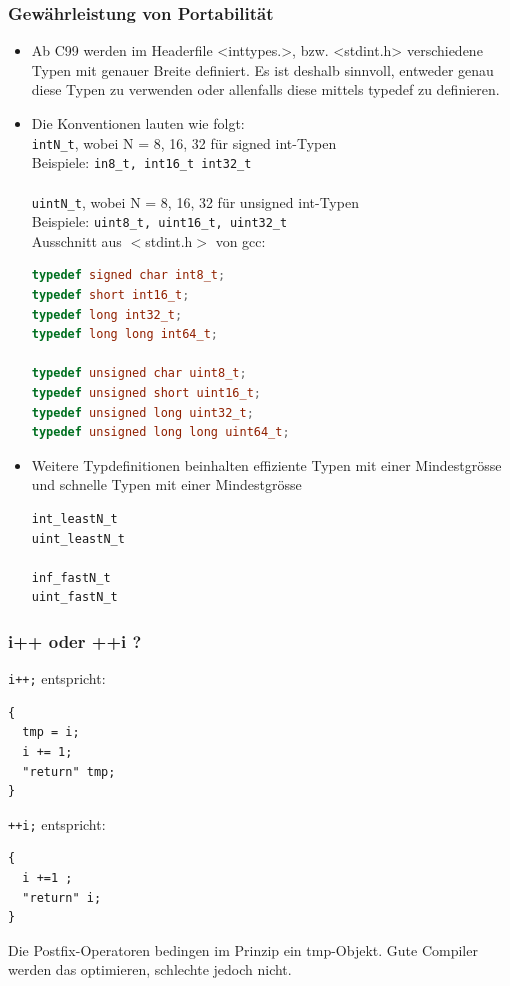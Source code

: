 \subsubsection{Gewährleistung von Portabilität}
\begin{itemize}
	\item Ab C99 werden im Headerfile <inttypes.>, bzw. <stdint.h> verschiedene Typen mit genauer Breite definiert. Es ist deshalb sinnvoll, entweder genau diese Typen zu verwenden oder allenfalls diese mittels typedef zu definieren.
	\item Die Konventionen lauten wie folgt:\\
	\lstinline{intN_t}, wobei N = 8, 16, 32 für signed int-Typen\\
	Beispiele: \lstinline{in8_t, int16_t int32_t}\\
	\\
	\lstinline{uintN_t}, wobei N = 8, 16, 32 für unsigned int-Typen\\
	Beispiele: \lstinline{uint8_t, uint16_t, uint32_t}\\
	Ausschnitt aus $<$stdint.h$>$ von gcc:
\begin{lstlisting}[language=C++]
typedef signed char int8_t;
typedef short int16_t;
typedef long int32_t;
typedef long long int64_t;

typedef unsigned char uint8_t;
typedef unsigned short uint16_t;
typedef unsigned long uint32_t;
typedef unsigned long long uint64_t;
\end{lstlisting}
\item Weitere Typdefinitionen beinhalten effiziente Typen mit einer Mindestgrösse und schnelle Typen mit einer Mindestgrösse
\begin{lstlisting}
int_leastN_t
uint_leastN_t

inf_fastN_t
uint_fastN_t
\end{lstlisting}
\end{itemize}

\subsubsection{i++ oder ++i ?}
\begin{multicols}{2}
\lstinline{i++;} entspricht:
\begin{lstlisting}
{
  tmp = i;
  i += 1;
  "return" tmp;
}
\end{lstlisting}
\vfill\null
\lstinline{++i;} entspricht:
\begin{lstlisting}
{
  i +=1 ;
  "return" i;
}
\end{lstlisting}
\end{multicols}
Die Postfix-Operatoren bedingen im Prinzip ein tmp-Objekt. Gute Compiler werden das optimieren, schlechte jedoch nicht.


